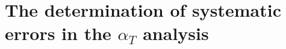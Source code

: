 
\section{The determination of systematic errors in the $\alpha_T$ analysis}
\label{sec:closureTests}





